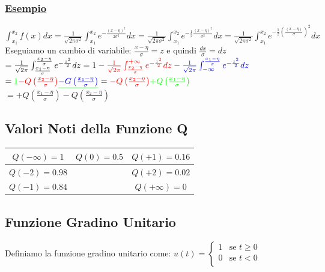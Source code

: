 \documentclass{article}
\begin{document}
\subsubsection{\underline{Esempio}}
$\int_{x_1}^{x_2} f(x) dx = \frac{1}{\sqrt{2 \pi \sigma^2}} \int_{x_1}^{x_2} e^{-\frac{(x - \eta)^2}{2 \sigma^2}} dx =
\frac{1}{\sqrt{2 \pi \sigma^2}} \int_{x_1}^{x_2} e^{-\frac12 \frac{(x - \eta)^2}{\sigma^2}} dx =
\frac{1}{\sqrt{2 \pi \sigma^2}} \int_{x_1}^{x_2} e^{-\frac12 \left( \frac{(x - \eta)}{\sigma} \right)^2 }  dx$ \\
Eseguiamo un cambio di variabile: $\frac{x - \eta}{\sigma} = z$ e quindi $\frac{dx}{\sigma} = dz$ \\
$= \frac{1}{\sqrt{2 \pi }} \int_{\frac{x_1 - \eta }{\sigma}}^{\frac{x_2 - \eta }{\sigma}} e^{- \frac{z^2}{2} } dz =
1 - {\color{red} \frac{1}{\sqrt{2 \pi }} \int_{\frac{x_2 - \eta }{\sigma}}^{+\infty} e^{- \frac{z^2}{2} } dz} 
- {\color{blue} \frac{1}{\sqrt{2 \pi }} \int_{- \infty}^{\frac{x_1 - \eta }{\sigma}} e^{- \frac{z^2}{2} } dz}$ \\
$ = {\color{green}\underline 1}  {\color{red} -Q\left( \frac{x_2 - \eta}{\sigma} \right) } {\color{green}\underline{ {\color{blue} -G\left( \frac{x_1 - \eta}{\sigma} \right) }}}
= {\color{red} -Q\left( \frac{x_2 - \eta}{\sigma} \right) } {\color{green} +Q\left( \frac{x_1 - \eta}{\sigma} \right) } $ \\
$= +Q\left( \frac{x_1 - \eta}{\sigma} \right)   -Q\left( \frac{x_2 - \eta}{\sigma} \right) $

\subsection{Valori Noti della Funzione Q}
\begin{table} [h]
    \centering
    \begin{tabular}{|c|c|c|}
    \hline
        $Q(-\infty) = 1$ & $Q(0) = 0.5 $ & $Q(+1) = 0.16$\\
        \hline 
        $Q(-2) = 0.98$ &  & $Q(+2) = 0.02$\\
        \hline 
        $Q(-1) = 0.84$&  & $Q(+\infty) = 0$\\
    \hline
    \end{tabular}
\end{table}

\subsection{Funzione Gradino Unitario}
Definiamo la funzione gradino unitario come: $u(t) = \begin{cases} 
1 & \text{se } t \geq 0 \\
0 & \text{se } t < 0 \\
\end{cases}$
\end{document}

